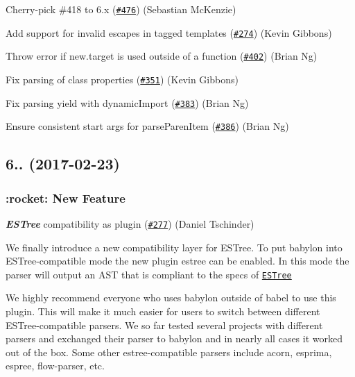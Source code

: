 \begin{DoxyItemize}
\item Cherry-\/pick \#418 to 6.\+x (\href{https://github.com/babel/babylon/pull/476}{\tt \#476}) (Sebastian Mc\+Kenzie)
\item Add support for invalid escapes in tagged templates (\href{https://github.com/babel/babylon/pull/274}{\tt \#274}) (Kevin Gibbons)
\item Throw error if new.\+target is used outside of a function (\href{https://github.com/babel/babylon/pull/402}{\tt \#402}) (Brian Ng)
\item Fix parsing of class properties (\href{https://github.com/babel/babylon/pull/351}{\tt \#351}) (Kevin Gibbons)
\item Fix parsing yield with dynamic\+Import (\href{https://github.com/babel/babylon/pull/383}{\tt \#383}) (Brian Ng)
\item Ensure consistent start args for parse\+Paren\+Item (\href{https://github.com/babel/babylon/pull/386}{\tt \#386}) (Brian Ng)
\end{DoxyItemize}

\subsection*{6.. (2017-\/02-\/23)}

\subsubsection*{\+:rocket\+: New Feature}

{\itshape {\bfseries E\+S\+Tree}} compatibility as plugin (\href{https://github.com/babel/babylon/pull/277}{\tt \#277}) (Daniel Tschinder)

We finally introduce a new compatibility layer for E\+S\+Tree. To put babylon into E\+S\+Tree-\/compatible mode the new plugin {\ttfamily estree} can be enabled. In this mode the parser will output an A\+ST that is compliant to the specs of \href{https://github.com/estree/estree/}{\tt E\+S\+Tree}

We highly recommend everyone who uses babylon outside of babel to use this plugin. This will make it much easier for users to switch between different E\+S\+Tree-\/compatible parsers. We so far tested several projects with different parsers and exchanged their parser to babylon and in nearly all cases it worked out of the box. Some other estree-\/compatible parsers include {\ttfamily acorn}, {\ttfamily esprima}, {\ttfamily espree}, {\ttfamily flow-\/parser}, etc.


